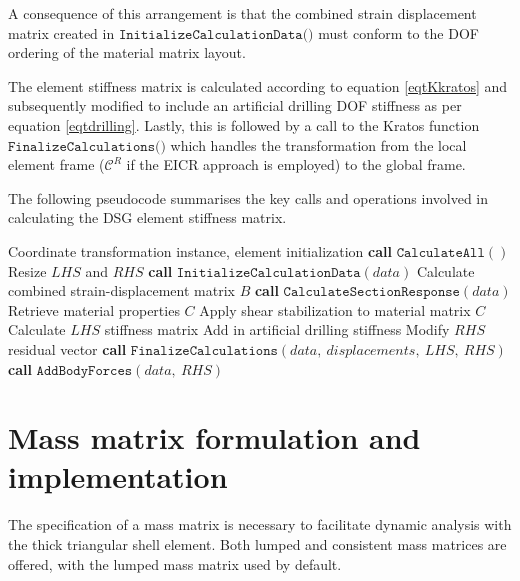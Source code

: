 A consequence of this arrangement is that the combined strain displacement matrix created in $\texttt{InitializeCalculationData()}$ must conform to the DOF ordering of the material matrix layout.

The element stiffness matrix is calculated according to equation \eqref{eqtKkratos} and subsequently modified to include an artificial drilling DOF stiffness as per equation \eqref{eqtdrilling}. Lastly, this is followed by a call to the Kratos function $\texttt{FinalizeCalculations()}$ which handles the transformation from the local element frame ($\mathscr{C}^R$ if the EICR approach is employed) to the global frame.

The following pseudocode summarises the key calls and operations involved in calculating the DSG element stiffness matrix.

\begin{algorithm}
	\onehalfspacing
	\label{DSG triangle element stiffness matrix}
	\begin{algorithmic}[1]
		\Require Coordinate transformation instance, element initialization
		\State \textbf{call} $\texttt{CalculateAll}()$
		\State Resize $LHS$ and $RHS$
		\State \textbf{call} $\texttt{InitializeCalculationData}(data)$
		\State \hspace{\algorithmicindent}Calculate combined strain-displacement matrix $B$
		\State \textbf{call} $\texttt{CalculateSectionResponse}(data)$
		\State \hspace{\algorithmicindent}Retrieve material properties $C$
		\State \hspace{\algorithmicindent}Apply shear stabilization to material matrix $C$
		\State Calculate $LHS$ stiffness matrix
		\State Add in artificial drilling stiffness
		\State Modify $RHS$ residual vector
		\State \textbf{call} $\texttt{FinalizeCalculations}(data,\ displacements,\ LHS,\ RHS)$
		\State \textbf{call} $\texttt{AddBodyForces}(data,\ RHS)$
	\end{algorithmic}
\end{algorithm}




\section{Mass matrix formulation and implementation}

The specification of a mass matrix is necessary to facilitate dynamic analysis with the thick triangular shell element. Both lumped and consistent mass matrices are offered, with the lumped mass matrix used by default.

